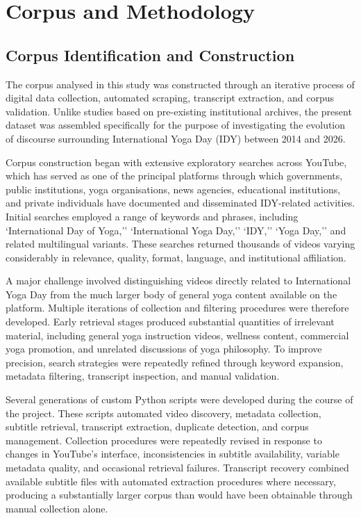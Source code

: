 \documentclass[11pt]{article}
\begin{document}
\section{Corpus and Methodology}



\subsection{Corpus Identification and Construction}



The corpus analysed in this study was constructed through an iterative process of digital data collection, automated
scraping, transcript extraction, and corpus validation. Unlike studies based on pre-existing institutional archives, the
present dataset was assembled specifically for the purpose of investigating the evolution of discourse surrounding
International Yoga Day (IDY) between 2014 and 2026.


Corpus construction began with extensive exploratory searches across YouTube, which has served as one of the principal
platforms through which governments, public institutions, yoga organisations, news agencies, educational institutions,
and private individuals have documented and disseminated IDY-related activities. Initial searches employed a range of
keywords and phrases, including `International Day of Yoga,'' `International Yoga Day,'' `IDY,'' `Yoga Day,'' and
related multilingual variants. These searches returned thousands of videos varying considerably in relevance, quality,
format, language, and institutional affiliation.


A major challenge involved distinguishing videos directly related to International Yoga Day from the much larger body of
general yoga content available on the platform. Multiple iterations of collection and filtering procedures were
therefore developed. Early retrieval stages produced substantial quantities of irrelevant material, including general
yoga instruction videos, wellness content, commercial yoga promotion, and unrelated discussions of yoga philosophy. To
improve precision, search strategies were repeatedly refined through keyword expansion, metadata filtering, transcript
inspection, and manual validation.


Several generations of custom Python scripts were developed during the course of the project. These scripts automated
video discovery, metadata collection, subtitle retrieval, transcript extraction, duplicate detection, and corpus
management. Collection procedures were repeatedly revised in response to changes in YouTube's interface, inconsistencies
in subtitle availability, variable metadata quality, and occasional retrieval failures. Transcript recovery combined
available subtitle files with automated extraction procedures where necessary, producing a substantially larger corpus
than would have been obtainable through manual collection alone.
\end{document}
